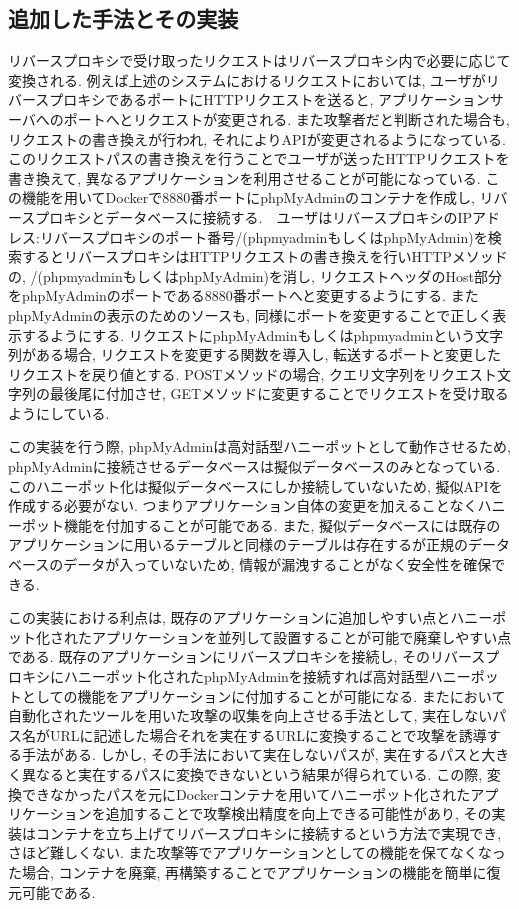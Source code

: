 \documentclass[submit,techrep,noauthor]{ipsj}
\begin{document}
\subsection{追加した手法とその実装}
リバースプロキシで受け取ったリクエストはリバースプロキシ内で必要に応じて変換される. 例えば上述のシステムにおけるリクエストにおいては, ユーザがリバースプロキシであるポートにHTTPリクエストを送ると, アプリケーションサーバへのポートへとリクエストが変更される. また攻撃者だと判断された場合も, リクエストの書き換えが行われ, それによりAPIが変更されるようになっている.　
このリクエストパスの書き換えを行うことでユーザが送ったHTTPリクエストを書き換えて, 異なるアプリケーションを利用させることが可能になっている.
この機能を用いてDockerで8880番ポートにphpMyAdminのコンテナを作成し, リバースプロキシとデータベースに接続する.　ユーザはリバースプロキシのIPアドレス:リバースプロキシのポート番号/(phpmyadminもしくはphpMyAdmin)を検索するとリバースプロキシはHTTPリクエストの書き換えを行いHTTPメソッドの, /(phpmyadminもしくはphpMyAdmin)を消し, リクエストヘッダのHost部分をphpMyAdminのポートである8880番ポートへと変更するようにする. またphpMyAdminの表示のためのソースも, 同様にポートを変更することで正しく表示するようにする.
リクエストにphpMyAdminもしくはphpmyadminという文字列がある場合, リクエストを変更する関数を導入し, 転送するポートと変更したリクエストを戻り値とする. POSTメソッドの場合, クエリ文字列をリクエスト文字列の最後尾に付加させ, GETメソッドに変更することでリクエストを受け取るようにしている.\par
この実装を行う際, phpMyAdminは高対話型ハニーポットとして動作させるため, phpMyAdminに接続させるデータベースは擬似データベースのみとなっている. このハニーポット化は擬似データベースにしか接続していないため, 擬似APIを作成する必要がない. つまりアプリケーション自体の変更を加えることなくハニーポット機能を付加することが可能である.
また, 擬似データベースには既存のアプリケーションに用いるテーブルと同様のテーブルは存在するが正規のデータベースのデータが入っていないため, 情報が漏洩することがなく安全性を確保できる. \par
この実装における利点は, 既存のアプリケーションに追加しやすい点とハニーポット化されたアプリケーションを並列して設置することが可能で廃棄しやすい点である. 既存のアプリケーションにリバースプロキシを接続し, そのリバースプロキシにハニーポット化されたphpMyAdminを接続すれば高対話型ハニーポットとしての機能をアプリケーションに付加することが可能になる. また\cite{label11}において自動化されたツールを用いた攻撃の収集を向上させる手法として, 実在しないパス名がURLに記述した場合それを実在するURLに変換することで攻撃を誘導する手法がある.
しかし, その手法において実在しないパスが, 実在するパスと大きく異なると実在するパスに変換できないという結果が得られている. この際, 変換できなかったパスを元にDockerコンテナを用いてハニーポット化されたアプリケーションを追加することで攻撃検出精度を向上できる可能性があり, その実装はコンテナを立ち上げてリバースプロキシに接続するという方法で実現でき, さほど難しくない. また攻撃等でアプリケーションとしての機能を保てなくなった場合, コンテナを廃棄, 再構築することでアプリケーションの機能を簡単に復元可能である.
\end{document}
